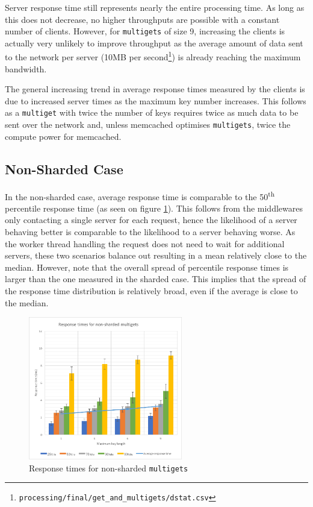 \documentclass[11pt,a4paper]{article}
\begin{document}
Server response time still represents nearly the entire processing time. As long as this does not decrease, no higher throughputs are possible with a constant number of clients. However, for \texttt{multigets} of size 9, increasing the clients is actually very unlikely to improve throughput as the average amount of data sent to the network per server (10MB per second\footnote{\texttt{processing/final/get_and_multigets/dstat.csv}}) is already reaching the maximum bandwidth.

The general increasing trend in average response times measured by the clients is due to increased server times as the maximum key number increases. This follows as a \texttt{multiget} with twice the number of keys requires twice as much data to be sent over the network and, unless memcached optimises \texttt{multigets}, twice the compute power for memcached.

\subsection{Non-Sharded Case}
In the non-sharded case, average response time is comparable to the 50\textsuperscript{th} percentile response time (as seen on figure \ref{png::get_and_multigets_latency-keylen_non-sharded}). This follows from the middlewares only contacting a single server for each request, hence the likelihood of a server behaving better is comparable to the likelihood to a server behaving worse. As the worker thread handling the request does not need to wait for additional servers, these two scenarios balance out resulting in a mean relatively close to the median. However, note that the overall spread of percentile response times is larger than the one measured in the sharded case. This implies that the spread of the response time distribution is relatively broad, even if the average is close to the median.

\begin{figure}[!h]
    \centering
    \includegraphics[width=0.6\textwidth]{processing/graphics/get_and_multigets_latency-keylen_non-sharded.png}
    \caption{Response times for non-sharded \texttt{multigets}}
    \label{png::get_and_multigets_latency-keylen_non-sharded}
\end{figure}
\end{document}
